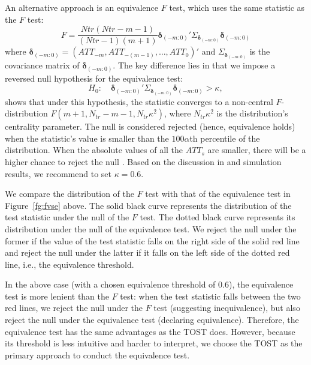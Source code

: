 \documentclass[12pt]{article}
\begin{document}
An alternative approach is an equivalence $F$ test, which uses the same statistic as the $F$ test:
$$F = \frac{Ntr(Ntr-m-1)}{(Ntr-1)(m+1)} \bm{\delta}_{(-m:0)}'\Sigma_{\bm{\delta}_{(-m:0)}}\bm{\delta}_{(-m:0)}$$
where $\bm{\delta}_{(-m:0)}= (ATT_{-m},ATT_{-(m-1)},\dots, ATT_{0})'$ and $\Sigma_{\bm{\delta}_{(-m:0)}}$ is the covariance matrix of $\bm{\delta}_{(-m:0)}$. The key difference lies in that we impose a reversed null hypothesis for the equivalence test:
$$H_0: \quad \bm\delta_{(-m:0)}'\Sigma_{\bm\delta_{(-m:0)}}\bm\delta_{(-m:0)} > \kappa,$$
\citet{wellek2010testing} shows that under this hypothesis, the statistic converges to a non-central $F$-distribution $F(m+1, N_{tr}-m-1, N_{tr}\kappa^2)$, where $N_{tr}\kappa^2$ is the distribution's centrality parameter. The null is considered rejected (hence, equivalence holds) when the statistic's value is smaller than the $100\alpha$th percentile of the distribution. When the absolute values of all the $ATT_{s}$ are smaller, there will be a higher chance to reject the null . Based on the discussion in \citet{wellek2010testing} and simulation results, we recommend to set $\kappa = 0.6$. 


We compare the distribution of the $F$ test with that of the equivalence test in Figure~\ref{fg:fvse} above. The solid black curve represents the distribution of the test statistic under the null of the $F$ test. The dotted black curve represents its distribution under the null of the equivalence test. We reject the null under the former if the value of the test statistic falls on the right side of the solid red line and reject the null under the latter if it falls on the left side of the dotted red line, i.e., the equivalence threshold. 

In the above case (with a chosen equivalence threshold of 0.6), the equivalence test is more lenient than the $F$ test: when the test statistic falls between the two red lines, we reject the null under the $F$ test (suggesting inequivalence), but also reject the null under the equivalence test (declaring equivalence). Therefore, the equivalence test has the same advantages as the TOST does. However, because its threshold is less intuitive and harder to interpret, we choose the TOST as the primary approach to conduct the equivalence test. 
\end{document}

